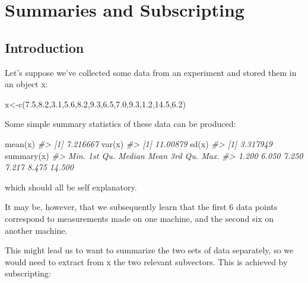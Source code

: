 \documentclass[
]{book}
\newenvironment{Shaded}{\begin{snugshade}}{\end{snugshade}}
\newcommand{\CommentTok}[1]{\textcolor[rgb]{0.56,0.35,0.01}{\textit{#1}}}
\newcommand{\FloatTok}[1]{\textcolor[rgb]{0.00,0.00,0.81}{#1}}
\newcommand{\FunctionTok}[1]{\textcolor[rgb]{0.00,0.00,0.00}{#1}}
\newcommand{\NormalTok}[1]{#1}
\newcommand{\OtherTok}[1]{\textcolor[rgb]{0.56,0.35,0.01}{#1}}
\begin{document}
\hypertarget{summaries-and-subscripting}{%
\chapter{Summaries and Subscripting}\label{summaries-and-subscripting}}

\hypertarget{introduction-2}{%
\section{Introduction}\label{introduction-2}}

Let's suppose we've collected some data from an experiment and stored them in an object x:

\begin{Shaded}
\begin{Highlighting}[]
\NormalTok{x}\OtherTok{\textless{}{-}}\FunctionTok{c}\NormalTok{(}\FloatTok{7.5}\NormalTok{,}\FloatTok{8.2}\NormalTok{,}\FloatTok{3.1}\NormalTok{,}\FloatTok{5.6}\NormalTok{,}\FloatTok{8.2}\NormalTok{,}\FloatTok{9.3}\NormalTok{,}\FloatTok{6.5}\NormalTok{,}\FloatTok{7.0}\NormalTok{,}\FloatTok{9.3}\NormalTok{,}\FloatTok{1.2}\NormalTok{,}\FloatTok{14.5}\NormalTok{,}\FloatTok{6.2}\NormalTok{)}
\end{Highlighting}
\end{Shaded}

Some simple summary statistics of these data can be produced:

\begin{Shaded}
\begin{Highlighting}[]
\FunctionTok{mean}\NormalTok{(x)}
\CommentTok{\#\textgreater{} [1] 7.216667}
\FunctionTok{var}\NormalTok{(x)}
\CommentTok{\#\textgreater{} [1] 11.00879}
\FunctionTok{sd}\NormalTok{(x)}
\CommentTok{\#\textgreater{} [1] 3.317949}
\FunctionTok{summary}\NormalTok{(x)}
\CommentTok{\#\textgreater{}    Min. 1st Qu.  Median    Mean 3rd Qu.    Max. }
\CommentTok{\#\textgreater{}   1.200   6.050   7.250   7.217   8.475  14.500}
\end{Highlighting}
\end{Shaded}

which should all be self explanatory.

It may be, however, that we subsequently learn that the first 6 data points correspond to measurements made on one machine, and the second six on another machine.

This might lead us to want to summarize the two sets of data separately, so we would need to extract from
x the two relevant subvectors. This is achieved by subscripting:
\end{document}
